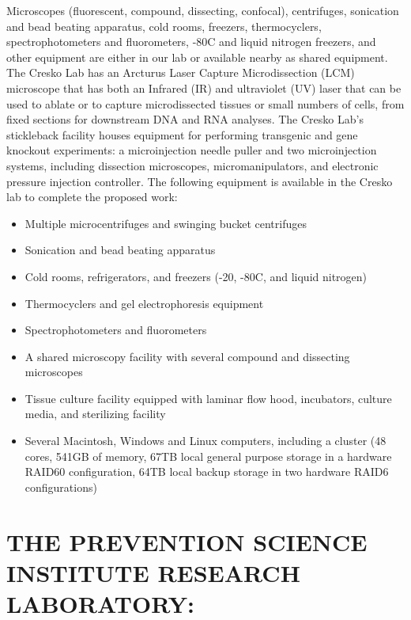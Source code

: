 \documentclass[
]{book}
\providecommand{\tightlist}{%
  \setlength{\itemsep}{0pt}\setlength{\parskip}{0pt}}
\begin{document}
Microscopes (fluorescent, compound, dissecting, confocal), centrifuges, sonication and bead beating apparatus, cold rooms, freezers, thermocyclers, spectrophotometers and fluorometers, -80C and liquid nitrogen freezers, and other equipment are either in our lab or available nearby as shared equipment. The Cresko Lab has an Arcturus Laser Capture Microdissection (LCM) microscope that has both an Infrared (IR) and ultraviolet (UV) laser that can be used to ablate or to capture microdissected tissues or small numbers of cells, from fixed sections for downstream DNA and RNA analyses. The Cresko Lab's stickleback facility houses equipment for performing transgenic and gene knockout experiments: a microinjection needle puller and two microinjection systems, including dissection microscopes, micromanipulators, and electronic pressure injection controller. The following equipment is available in the Cresko lab to complete the proposed work:

\begin{itemize}
\tightlist
\item
  Multiple microcentrifuges and swinging bucket centrifuges
\item
  Sonication and bead beating apparatus
\item
  Cold rooms, refrigerators, and freezers (-20, -80C, and liquid nitrogen)
\item
  Thermocyclers and gel electrophoresis equipment
\item
  Spectrophotometers and fluorometers
\item
  A shared microscopy facility with several compound and dissecting microscopes
\item
  Tissue culture facility equipped with laminar flow hood, incubators, culture media, and sterilizing facility
\item
  Several Macintosh, Windows and Linux computers, including a cluster (48 cores, 541GB of memory, 67TB local general purpose storage in a hardware RAID60 configuration, 64TB local backup storage in two hardware RAID6 configurations)
\end{itemize}

\hypertarget{the-prevention-science-institute-research-laboratory}{%
\section{THE PREVENTION SCIENCE INSTITUTE RESEARCH LABORATORY:}\label{the-prevention-science-institute-research-laboratory}}
\end{document}
